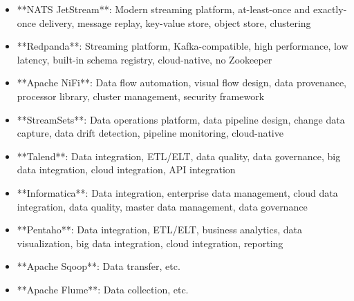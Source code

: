 \documentclass[11pt,a4paper]{article}
\begin{document}
\begin{itemize}
\item **NATS JetStream**: Modern streaming platform, at-least-once and exactly-once delivery, message replay, key-value store, object store, clustering
\end{itemize}

\begin{itemize}
\item **Redpanda**: Streaming platform, Kafka-compatible, high performance, low latency, built-in schema registry, cloud-native, no Zookeeper
\end{itemize}

\begin{itemize}
\item **Apache NiFi**: Data flow automation, visual flow design, data provenance, processor library, cluster management, security framework
\end{itemize}

\begin{itemize}
\item **StreamSets**: Data operations platform, data pipeline design, change data capture, data drift detection, pipeline monitoring, cloud-native
\end{itemize}

\begin{itemize}
\item **Talend**: Data integration, ETL/ELT, data quality, data governance, big data integration, cloud integration, API integration
\end{itemize}

\begin{itemize}
\item **Informatica**: Data integration, enterprise data management, cloud data integration, data quality, master data management, data governance
\end{itemize}

\begin{itemize}
\item **Pentaho**: Data integration, ETL/ELT, business analytics, data visualization, big data integration, cloud integration, reporting
\end{itemize}

\begin{itemize}
\item **Apache Sqoop**: Data transfer, etc.
\end{itemize}

\begin{itemize}
\item **Apache Flume**: Data collection, etc.
\end{itemize}
\end{document}
